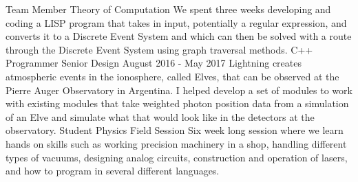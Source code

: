 \begin{cventries}
  \cventry
    {Team Member}
    {Theory of Computation}
    {}
    {}
    {
      We spent three weeks developing and coding a LISP program that takes in input, potentially a
      regular expression, and converts it to a Discrete Event System and which can then be solved
      with a route through the Discrete Event System using graph traversal methods.
    }
  \cventry
    {C++ Programmer}
    {Senior Design}
    {}
    {August 2016 - May 2017}
    {
      Lightning creates atmospheric events in the ionosphere, called Elves, that can be observed at
      the Pierre Auger Observatory in Argentina. I helped develop a set of modules to work with
      existing modules that take weighted photon position data from a simulation of an Elve and
      simulate what that would look like in the detectors at the observatory.
    }
  \cventry
    {Student}
    {Physics Field Session}
    {}
    {}
    {
      Six week long session where we learn hands on skills such as working precision machinery in a
      shop, handling different types of vacuums, designing analog circuits, construction and
      operation of lasers, and how to program in several different languages.
    }
\end{cventries}

